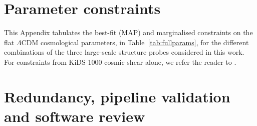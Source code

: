 \begin{appendix}
\section{Parameter constraints}
\label{app:parameter-constraints}
This Appendix tabulates the best-fit (MAP) and marginalised constraints on the flat $\Lambda$CDM cosmological parameters, in Table~\ref{tab:fullparams}, for the different combinations of the three large-scale structure probes considered in this work.   For constraints from KiDS-1000 cosmic shear alone, we refer the reader to \citet{asgari/etal:inprep}.



\section{Redundancy, pipeline validation and software review}
\label{app:codereview}


\end{appendix}
